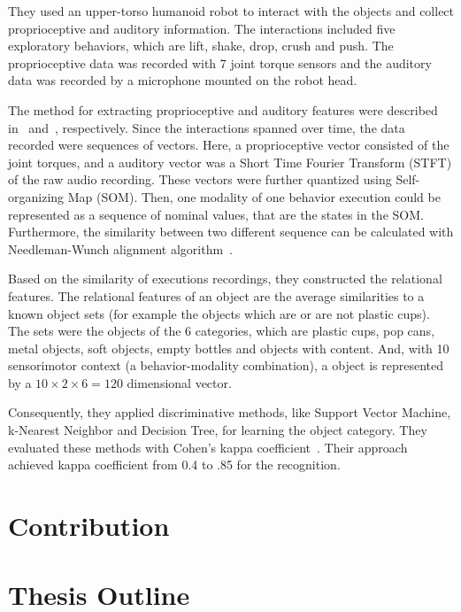 \documentclass[12pt,final,twoside]{report}
\theoremstyle{plain}
\theoremstyle{definition}
\theoremstyle{remark}
\begin{document}
They used an upper-torso humanoid robot to interact with the objects and collect proprioceptive and auditory information. The interactions included five exploratory behaviors, which are lift, shake, drop, crush and push. The proprioceptive data was recorded with 7 joint torque sensors and the auditory data was recorded by a microphone mounted on the robot head.

The method for extracting proprioceptive and auditory features were described in~\cite{bergquist_interactive_2009} and~\cite{sinapov_interactive_2009}, respectively. Since the interactions spanned over time, the data recorded were sequences of vectors. Here, a proprioceptive vector consisted of the joint torques, and a auditory vector was a Short Time Fourier Transform (STFT) of the raw audio recording. These vectors were further quantized using Self-organizing Map (SOM). Then, one modality of one behavior execution could be represented as a sequence of nominal values, that are the states in the SOM. Furthermore, the similarity between two different sequence can be calculated with Needleman-Wunch alignment algorithm~\cite{needleman_general_1970}.

Based on the similarity of executions recordings, they constructed the relational features. The relational features of an object are the average similarities to a known object sets (for example the objects which are or are not plastic cups). The sets were the objects of the 6 categories, which are plastic cups, pop cans, metal objects, soft objects, empty bottles and objects with content. And, with 10 sensorimotor context (a behavior-modality combination), a object is represented by a $10 \times 2 \times 6 = 120$ dimensional vector.

Consequently, they applied discriminative methods, like Support Vector Machine, k-Nearest Neighbor and Decision Tree, for learning the object category. They evaluated these methods with Cohen's kappa coefficient~\cite{cohen_coefficient_1960}. Their approach achieved kappa coefficient from 0.4 to .85 for the recognition.

\section{Contribution}

\section{Thesis Outline}

\cleardoublepage
\end{document}
